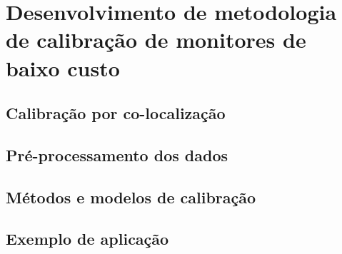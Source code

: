 \chapter{Desenvolvimento de metodologia de calibração de monitores de baixo custo}\label{cap:field-monit-results}

\section{Calibração por co-localização}

\section{Pré-processamento dos dados}










\section{Métodos e modelos de calibração}



\section{Exemplo de aplicação}